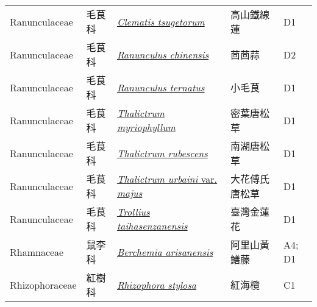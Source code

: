 {\begin{longtable}{p{2.5cm}p{2cm}p{5cm}p{2.5cm}p{3cm}}
    Ranunculaceae & 毛茛科 & \href{http://www.theplantlist.org/tpl1.1/search?q=Clematis+tsugetorum}{\textit{Clematis tsugetorum} } & 高山鐵線蓮 & D1 \index{Clematis@\textit{Clematis}!tsugetorum@\textit{tsugetorum}}  \index{高山鐵線蓮} \\
    Ranunculaceae & 毛茛科 & \href{http://www.theplantlist.org/tpl1.1/search?q=Ranunculus+chinensis}{\textit{Ranunculus chinensis} } & 茴茴蒜 & D2 \index{Ranunculus@\textit{Ranunculus}!chinensis@\textit{chinensis}}  \index{茴茴蒜} \\
    Ranunculaceae & 毛茛科 & \href{http://www.theplantlist.org/tpl1.1/search?q=Ranunculus+ternatus}{\textit{Ranunculus ternatus} } & 小毛茛 & D1 \index{Ranunculus@\textit{Ranunculus}!ternatus@\textit{ternatus}}  \index{小毛茛} \\
    Ranunculaceae & 毛茛科 & \href{http://www.theplantlist.org/tpl1.1/search?q=Thalictrum+myriophyllum}{\textit{Thalictrum myriophyllum} } & 密葉唐松草 & D1 \index{Thalictrum@\textit{Thalictrum}!myriophyllum@\textit{myriophyllum}}  \index{密葉唐松草} \\
    Ranunculaceae & 毛茛科 & \href{http://www.theplantlist.org/tpl1.1/search?q=Thalictrum+rubescens}{\textit{Thalictrum rubescens} } & 南湖唐松草 & D1 \index{Thalictrum@\textit{Thalictrum}!rubescens@\textit{rubescens}}  \index{南湖唐松草} \\
    Ranunculaceae & 毛茛科 & \href{http://www.theplantlist.org/tpl1.1/search?q=Thalictrum+urbaini+var.+majus}{\textit{Thalictrum urbaini} var. \textit{majus} } & 大花傅氏唐松草 & D1 \index{Thalictrum@\textit{Thalictrum}!urbaini@\textit{urbaini}!var. majus@var. \textit{majus}}  \index{大花傅氏唐松草} \\
    Ranunculaceae & 毛茛科 & \href{http://www.theplantlist.org/tpl1.1/search?q=Trollius+taihasenzanensis}{\textit{Trollius taihasenzanensis} } & 臺灣金蓮花 & D1 \index{Trollius@\textit{Trollius}!taihasenzanensis@\textit{taihasenzanensis}}  \index{臺灣金蓮花} \\
    Rhamnaceae & 鼠李科 & \href{http://www.theplantlist.org/tpl1.1/search?q=Berchemia+arisanensis}{\textit{Berchemia arisanensis} } & 阿里山黃鱔藤 & A4; D1 \index{Berchemia@\textit{Berchemia}!arisanensis@\textit{arisanensis}}  \index{阿里山黃鱔藤} \\
    Rhizophoraceae & 紅樹科 & \href{http://www.theplantlist.org/tpl1.1/search?q=Rhizophora+stylosa}{\textit{Rhizophora stylosa} } & 紅海欖 & C1 \index{Rhizophora@\textit{Rhizophora}!stylosa@\textit{stylosa}}  \index{紅海欖} \\

\end{longtable}}
